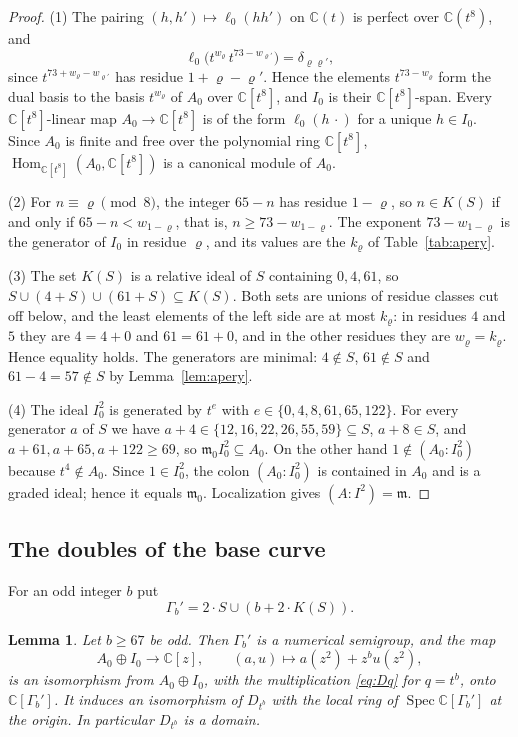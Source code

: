 \documentclass{amsart}
\newtheorem{lemma}[theorem]{Lemma}
\theoremstyle{definition}
\theoremstyle{remark}
\numberwithin{equation}{section}
\newcommand{\C}{\mathbb{C}}
\newcommand{\m}{\mathfrak{m}}
\DeclareMathOperator{\Hom}{Hom}
\DeclareMathOperator{\Spec}{Spec}
\begin{document}
\begin{proof}
(1) The pairing $(h,h')\mapsto\ell_0(hh')$ on $\C(t)$ is perfect over $\C(t^8)$, and
\[
\ell_0\bigl(t^{w_\varrho}\,t^{73-w_{\varrho'}}\bigr)=\delta_{\varrho\varrho'},
\]
since $t^{73+w_\varrho-w_{\varrho'}}$ has residue $1+\varrho-\varrho'$. Hence the elements $t^{73-w_\varrho}$ form the dual basis to the basis $t^{w_\varrho}$ of $A_0$ over $\C[t^8]$, and $I_0$ is their $\C[t^8]$-span. Every $\C[t^8]$-linear map $A_0\to\C[t^8]$ is of the form $\ell_0(h\,\cdot)$ for a unique $h\in I_0$. Since $A_0$ is finite and free over the polynomial ring $\C[t^8]$, $\Hom_{\C[t^8]}(A_0,\C[t^8])$ is a canonical module of $A_0$.

(2) For $n\equiv\varrho\pmod 8$, the integer $65-n$ has residue $1-\varrho$, so $n\in K(S)$ if and only if $65-n<w_{1-\varrho}$, that is, $n\ge73-w_{1-\varrho}$. The exponent $73-w_{1-\varrho}$ is the generator of $I_0$ in residue $\varrho$, and its values are the $k_\varrho$ of Table~\ref{tab:apery}.

(3) The set $K(S)$ is a relative ideal of $S$ containing $0,4,61$, so $S\cup(4+S)\cup(61+S)\subseteq K(S)$. Both sets are unions of residue classes cut off below, and the least elements of the left side are at most $k_\varrho$: in residues $4$ and $5$ they are $4=4+0$ and $61=61+0$, and in the other residues they are $w_\varrho=k_\varrho$. Hence equality holds. The generators are minimal: $4\notin S$, $61\notin S$ and $61-4=57\notin S$ by Lemma~\ref{lem:apery}.

(4) The ideal $I_0^2$ is generated by $t^e$ with $e\in\{0,4,8,61,65,122\}$. For every generator $a$ of $S$ we have $a+4\in\{12,16,22,26,55,59\}\subseteq S$, $a+8\in S$, and $a+61,a+65,a+122\ge69$, so $\m_0I_0^2\subseteq A_0$. On the other hand $1\notin(A_0:I_0^2)$ because $t^4\notin A_0$. Since $1\in I_0^2$, the colon $(A_0:I_0^2)$ is contained in $A_0$ and is a graded ideal; hence it equals $\m_0$. Localization gives $(A:I^2)=\m$.
\end{proof}

\subsection{The doubles of the base curve}
For an odd integer $b$ put
\[
\Gamma_b'=2\cdot S\cup(b+2\cdot K(S)).
\]

\begin{lemma}\label{lem:double-semigroup}
Let $b\ge67$ be odd. Then $\Gamma_b'$ is a numerical semigroup, and the map
\[
A_0\oplus I_0\longrightarrow\C[z],\qquad(a,u)\longmapsto a(z^2)+z^bu(z^2),
\]
is an isomorphism from $A_0\oplus I_0$, with the multiplication \eqref{eq:Dq} for $q=t^b$, onto $\C[\Gamma_b']$. It induces an isomorphism of $D_{t^b}$ with the local ring of $\Spec\C[\Gamma_b']$ at the origin. In particular $D_{t^b}$ is a domain.
\end{lemma}
\end{document}
